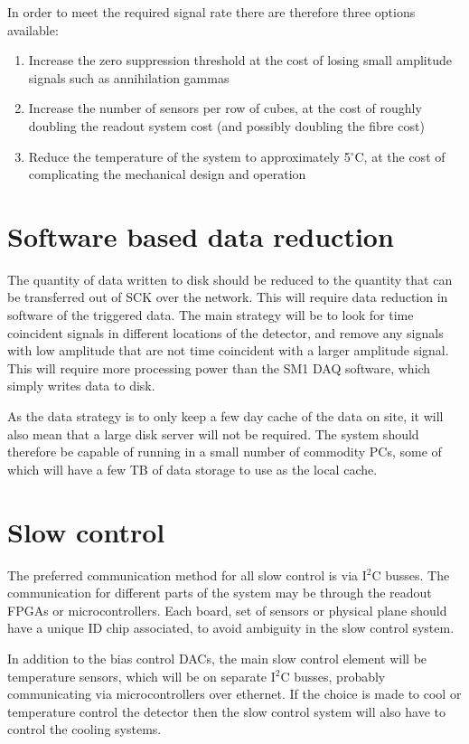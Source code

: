 \documentclass[a4paper]{article}
\begin{document}
In order to meet the required signal rate there are therefore three options available:
\begin{enumerate}
    \item Increase the zero suppression threshold at the cost of losing small amplitude signals such as annihilation gammas
    \item Increase the number of sensors per row of cubes, at the cost of roughly doubling the readout system cost (and possibly doubling the fibre cost)
    \item Reduce the temperature of the system to approximately 5$^{\circ}$C, at the cost of complicating the mechanical design and operation
\end{enumerate}

\section{Software based data reduction}

The quantity of data written to disk should be reduced to the quantity that can be transferred out of SCK over the network.
This will require data reduction in software of the triggered data.
The main strategy will be to look for time coincident signals in different locations of the detector, and remove any signals with low amplitude that are not time coincident with a larger amplitude signal.
This will require more processing power than the SM1 DAQ software, which simply writes data to disk.

As the data strategy is to only keep a few day cache of the data on site, it will also mean that a large disk server will not be required.
The system should therefore be capable of running in a small number of commodity PCs, some of which will have a few TB of data storage to use as the local cache.

\section{Slow control}

The preferred communication method for all slow control is via I$^2$C busses.
The communication for different parts of the system may be through the readout FPGAs or microcontrollers.
Each board, set of sensors or physical plane should have a unique ID chip associated, to avoid ambiguity in the slow control system.

In addition to the bias control DACs, the main slow control element will be temperature sensors, which will be on separate I$^2$C busses, probably communicating via microcontrollers over ethernet.
If the choice is made to cool or temperature control the detector then the slow control system will also have to control the cooling systems.
\end{document}
